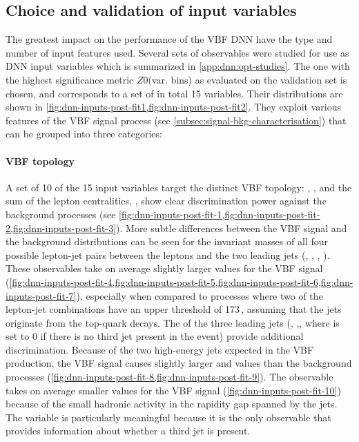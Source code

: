 \subsection{Choice and validation of input variables}
\label{subsec:input-variables-opt}
The greatest impact on the performance of the VBF DNN have the type and number of input features used.
Several sets of observables were studied for use as DNN input variables which is summarized in \cref{app:dnn:opt-studies}.
The one with the highest significance metric $Z0$(var. bins) as evaluated on the validation set is chosen, and corresponds to a set of in total 15 variables.
Their distributions are shown in \cref{fig:dnn-inputs-post-fit1,fig:dnn-inputs-post-fit2}.
They exploit various features of the VBF signal process (see \cref{subsec:signal-bkg-characterisation}) that can be grouped into three categories:

\paragraph{VBF topology}
A set of 10 of the 15 input variables target the distinct VBF topology: \mjj, \dyjj, and the sum of the lepton centralities, \lepetacent, show clear discrimination power against the background processes (see \cref{fig:dnn-inputs-post-fit-1,fig:dnn-inputs-post-fit-2,fig:dnn-inputs-post-fit-3}). More subtle differences between the VBF signal and the background distributions can be seen for the invariant masses of all four possible lepton-jet pairs between the leptons and the two leading jets (\mlonejone, \mlonejtwo, \mltwojone, \mltwojtwo). These observables take on average slightly larger values for the VBF signal (\cref{fig:dnn-inputs-post-fit-4,fig:dnn-inputs-post-fit-5,fig:dnn-inputs-post-fit-6,fig:dnn-inputs-post-fit-7}), especially when compared to \ttbar processes where two of the lepton-jet combinations have an upper threshold of 173\,\GeV, assuming that the jets originate from the top-quark decays.
The \pT of the three leading jets (\pTjone, \pTjtwo,\pTjthree, where \pTjthree is set to 0 if there is no third jet present in the event) provide additional discrimination.
Because of the two high-energy jets expected in the VBF production, the VBF signal causes slightly larger \pTjone and \pTjtwo values than the background processes (\cref{fig:dnn-inputs-post-fit-8,fig:dnn-inputs-post-fit-9}).
The \pTjthree observable takes on average smaller values for the VBF signal (\cref{fig:dnn-inputs-post-fit-10}) because of the small hadronic activity in the rapidity gap spanned by the jets. The \pTjthree variable is particularly meaningful because it is the only observable that provides information about whether a third jet is present.

